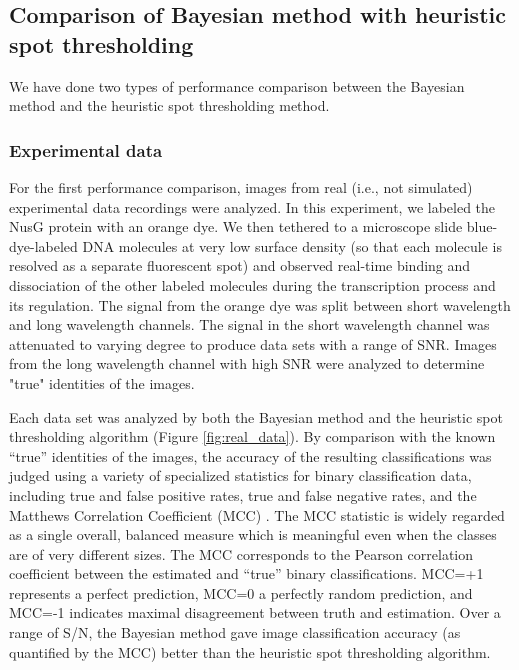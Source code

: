 \subsection{Comparison of Bayesian method with heuristic spot thresholding}

We have done two types of performance comparison between the Bayesian method and the heuristic spot thresholding method.

\subsubsection{Experimental data}

For the first performance comparison, images from real (i.e., not simulated) experimental data recordings were analyzed. In this experiment, we labeled the NusG protein with an orange dye. We then tethered to a microscope slide blue-dye-labeled DNA molecules at very low surface density (so that each molecule is resolved as a separate fluorescent spot) and observed real-time binding and dissociation of the other labeled molecules during the transcription process and its regulation. The signal from the orange dye was split between short wavelength and long wavelength channels. The signal in the short wavelength channel was attenuated to varying degree to produce data sets with a range of SNR. Images from the long wavelength channel with high SNR were analyzed to determine "true" identities of the images.

Each data set was analyzed by both the Bayesian method and the heuristic spot thresholding algorithm (Figure \ref{fig:real_data}). By comparison with the known “true” identities of the images, the accuracy of the resulting classifications was judged using a variety of specialized statistics for binary classification data, including true and false positive rates, true and false negative rates, and the Matthews Correlation Coefficient (MCC) \citep{Fawcett2006-bq, Matthews1975-rw}. The MCC statistic is widely regarded as a single overall, balanced measure which is meaningful even when the classes are of very different sizes. The MCC corresponds to the Pearson correlation coefficient between the estimated and “true” binary classifications. MCC=+1 represents a perfect prediction, MCC=0 a perfectly random prediction, and MCC=-1 indicates maximal disagreement between truth and estimation. Over a range of S/N, the Bayesian method gave image classification accuracy (as quantified by the MCC) better than the heuristic spot thresholding algorithm. 

